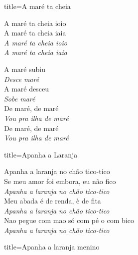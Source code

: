 \documentclass[fontsize=14pt, paper=a4, twoside, DIV=20]{scrreprt} %
\begin{document}
\begin{multicols*}{2}
\begin{song}{title={A maré ta cheia}}
        \begin{chorus*}
                A maré ta cheia ioio \\
                A maré ta cheia iaia \\
                \textit{A maré ta cheia ioio \\
                A maré ta cheia iaia \\}
        \end{chorus*}
        \begin{verse*}
                A maré subiu \\
                \textit{Desce maré} \\
                A maré desceu \\
                \textit{Sobe maré} \\
                De maré, de maré \\
                \textit{Vou pra ilha de maré} \\
                De maré, de maré \\
                \textit{Vou pra ilha de maré} \\

        \end{verse*}
\end{song}

\begin{song}{title={Apanha a Laranja}}

    \begin{verse*}
        Apanha a laranja no chão tico-tico\\
        Se meu amor foi embora, eu não fico\\

        \textit{Apanha a laranja} \textit{no chão tico-tico}\\
        Meu abada é de renda, è de fita\\
        \textit{Apanha a laranja} \textit{no chão tico-tico}\\
        Nao pegue com mao só com pé o com bico\\
        \textit{Apanha a laranja} \textit{no chão tico-tico} \\  
    \end{verse*}

\end{song}


\columnbreak
\begin{song}{title={Apanha a laranja menino}}


\end{song}
\end{multicols*}
\end{document}
